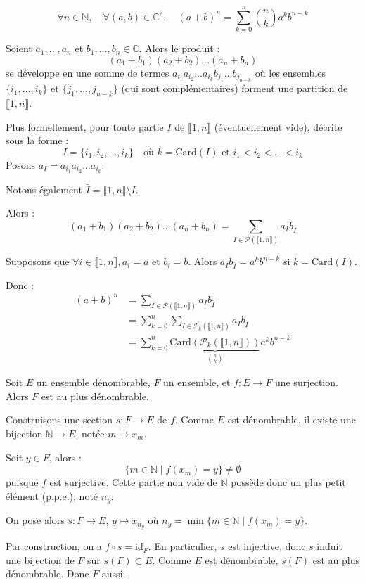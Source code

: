\documentclass[a4paper,11pt]{article}
\newcommand{\C}{\mathbb{C}}
\newcommand{\N}{\mathbb{N}}
\begin{document}
\begin{proposition}
  $$ \forall n \in \N, \quad \forall (a,b) \in \C^2, \quad (a+b)^n = \sum_{k=0}^n \binom{n}{k} a^k b^{n-k} $$
\end{proposition}

\begin{demonstration}[Combinatoire]
  Soient $a_1, \dots, a_n$ et $b_1, \dots, b_n \in \C$. Alors le produit :
  $$ (a_1+b_1)(a_2+b_2)\dots(a_n+b_n) $$
  se développe en une somme de termes $a_{i_1} a_{i_2} \dots a_{i_k} b_{j_1} \dots b_{j_{n-k}}$ où les ensembles $\{i_1, \dots, i_k\}$ et $\{j_1, \dots, j_{n-k}\}$ (qui sont complémentaires) forment une partition de $\llbracket 1, n \rrbracket$.
  
  Plus formellement, pour toute partie $I$ de $\llbracket 1, n \rrbracket$ (éventuellement vide), décrite sous la forme :
  $$ I = \{i_1, i_2, \dots, i_k\} \quad \text{où } k = \text{Card}(I) \text{ et } i_1 < i_2 < \dots < i_k $$
  Posons $a_I = a_{i_1} a_{i_2} \dots a_{i_k}$. 

  Notons également $\bar{I} = \llbracket 1, n \rrbracket \setminus I$.
  
  Alors :
  $$ (a_1+b_1)(a_2+b_2)\dots(a_n+b_n) = \sum_{I \in \mathcal{P}(\llbracket 1, n \rrbracket)} a_I b_{\bar{I}} $$
  
  Supposons que $\forall i \in \llbracket 1, n \rrbracket, a_i = a$ et $b_i = b$. 
  Alors $a_I b_{\bar{I}} = a^k b^{n-k}$ si $k = \text{Card}(I)$.
  
  Donc :
  \begin{align*}
    (a+b)^n &= \sum_{I \in \mathcal{P}(\llbracket 1, n \rrbracket)} a_I b_{\bar{I}} \\
            &= \sum_{k=0}^n \sum_{I \in \mathcal{P}_k(\llbracket 1, n \rrbracket)} a_I b_{\bar{I}} \\
            &= \sum_{k=0}^n \underbrace{\text{Card}(\mathcal{P}_k(\llbracket 1, n \rrbracket))}_{\binom{n}{k}} a^k b^{n-k}
  \end{align*}
\end{demonstration}

\begin{proposition}
Soit $E$ un ensemble dénombrable, $F$ un ensemble, et $f : E \to F$ une surjection. Alors $F$ est au plus dénombrable.
\end{proposition}

\begin{demonstration}
Construisons une section $s : F \to E$ de $f$. Comme $E$ est dénombrable, il existe une bijection $\N \to E$, notée $m \mapsto x_m$. 

Soit $y \in F$, alors :
$$ \{m \in \N \mid f(x_m) = y\} \neq \emptyset $$
puisque $f$ est surjective. Cette partie non vide de $\N$ possède donc un plus petit élément (p.p.e.), noté $n_y$.

On pose alors $s : F \to E$, $y \mapsto x_{n_y}$ où $n_y = \min \{m \in \N \mid f(x_m) = y\}$.

Par construction, on a $f \circ s = \text{id}_F$. En particulier, $s$ est injective, donc $s$ induit une bijection de $F$ sur $s(F) \subset E$. Comme $E$ est dénombrable, $s(F)$ est au plus dénombrable. Donc $F$ aussi.
\end{demonstration}
\end{document}
